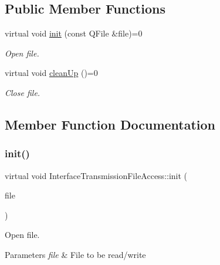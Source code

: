 \subsection*{Public Member Functions}
\begin{DoxyCompactItemize}
\item 
virtual void \hyperlink{classInterfaceTransmissionFileAccess_a8c423ccb527b1dda62c798a75b6eb690}{init} (const Q\+File \&file)=0
\begin{DoxyCompactList}\small\item\em Open file. \end{DoxyCompactList}\item 
\mbox{\label{classInterfaceTransmissionFileAccess_ab23bc8abfef07a7f30f05e87b25bbcfd}} 
virtual void \hyperlink{classInterfaceTransmissionFileAccess_ab23bc8abfef07a7f30f05e87b25bbcfd}{clean\+Up} ()=0
\begin{DoxyCompactList}\small\item\em Close file. \end{DoxyCompactList}\end{DoxyCompactItemize}


\subsection{Member Function Documentation}
\mbox{\label{classInterfaceTransmissionFileAccess_a8c423ccb527b1dda62c798a75b6eb690}} 
\subsubsection{\texorpdfstring{init()}{init()}}
{\footnotesize\ttfamily virtual void Interface\+Transmission\+File\+Access\+::init (\begin{DoxyParamCaption}\item[{const Q\+File \&}]{file }\end{DoxyParamCaption})\hspace{0.3cm}{\ttfamily [pure virtual]}}



Open file. 


\begin{DoxyParams}{Parameters}
{\em file} & File to be read/write \\
\hline
\end{DoxyParams}


